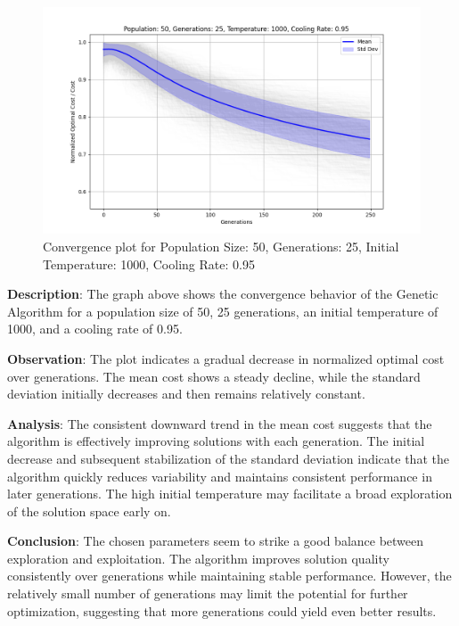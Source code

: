 \documentclass[
]{article}
\begin{document}
    \begin{figure}[H]
        \centering
        \includegraphics[width=\textwidth]{genetic_simulated_annealing_hybrid/Population_50_Generations_25_Temperature_1000_CoolingRate_0.95}
        \caption{Convergence plot for Population Size: 50, Generations: 25, Initial Temperature: 1000, Cooling Rate: 0.95}
        \label{fig:pop50_gen25_temp1000_cr0.95}
    \end{figure}

    \textbf{Description}: The graph above shows the convergence behavior of the Genetic Algorithm for a population size of 50, 25 generations, an initial temperature of 1000, and a cooling rate of 0.95.

    \textbf{Observation}: The plot indicates a gradual decrease in normalized optimal cost over generations. The mean cost shows a steady decline, while the standard deviation initially decreases and then remains relatively constant.

    \textbf{Analysis}: The consistent downward trend in the mean cost suggests that the algorithm is effectively improving solutions with each generation. The initial decrease and subsequent stabilization of the standard deviation indicate that the algorithm quickly reduces variability and maintains consistent performance in later generations. The high initial temperature may facilitate a broad exploration of the solution space early on.

    \textbf{Conclusion}: The chosen parameters seem to strike a good balance between exploration and exploitation. The algorithm improves solution quality consistently over generations while maintaining stable performance. However, the relatively small number of generations may limit the potential for further optimization, suggesting that more generations could yield even better results.
\end{document}
